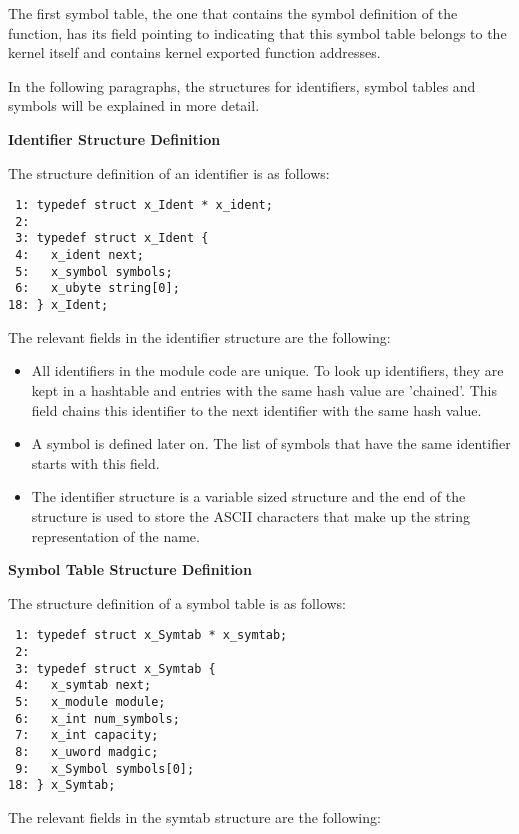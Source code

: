 The first symbol table, the one that contains the symbol definition of the
 function, has its 
field pointing to  indicating that this symbol table belongs to
the kernel itself and contains kernel exported function addresses.

In the following paragraphs, the structures for identifiers, symbol tables
and symbols will be explained in more detail.

\textbf{Identifier Structure Definition}

The structure definition of an identifier is as follows:

\bcode
\begin{verbatim}
 1: typedef struct x_Ident * x_ident;
 2:
 3: typedef struct x_Ident {
 4:   x_ident next;
 5:   x_symbol symbols;
 6:   x_ubyte string[0];
18: } x_Ident;
\end{verbatim}
\ecode

The relevant fields in the identifier structure are the following:

\begin{itemize}
\item {} All identifiers in the module code
are unique. To look up identifiers, they are kept in a hashtable and entries
with the same hash value are 'chained'. This field chains this identifier to
the next identifier with the same hash value.
\item {} A symbol is defined later on.
The list of symbols that have the same identifier starts with this field.
\item {} The identifier structure is a
variable sized structure and the end of the structure is used to store the
ASCII characters that make up the string representation of the name.
\end{itemize}

\textbf{Symbol Table Structure Definition}

The structure definition of a symbol table is as follows:

\bcode
\begin{verbatim}
 1: typedef struct x_Symtab * x_symtab;
 2:
 3: typedef struct x_Symtab {
 4:   x_symtab next;
 5:   x_module module;
 6:   x_int num_symbols;
 7:   x_int capacity;
 8:   x_uword madgic;
 9:   x_Symbol symbols[0];
18: } x_Symtab;
\end{verbatim}
\ecode

The relevant fields in the symtab structure are the following:

